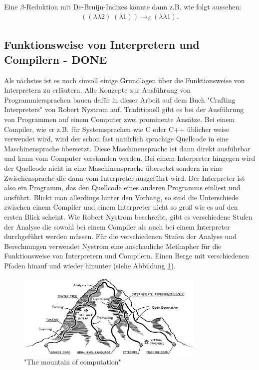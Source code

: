 \documentclass[ngerman]{article}
\begin{document}
Eine $\beta$-Reduktion mit De-Bruijn-Indizes könnte dann z.B. wie folgt aussehen:
\begin{align*}
    ((\lambda \lambda 2) \; (\lambda 1)) \rightarrow_\beta (\lambda\lambda 1).
\end{align*}

\subsection{Funktionsweise von Interpretern und Compilern - DONE}

Als nächstes ist es noch sinvoll einige Grundlagen über die Funktionsweise von Interpretern zu erläutern. Alle Konzepte zur Ausführung von Programmiersprachen bauen dafür in dieser Arbeit auf dem Buch "Crafting Interpreters" von Robert Nystrom \cite*{nystrom} auf.
Traditionell gibt es bei der Ausführung von Programmen auf einem Computer zwei prominente Ansätze. Bei einem Compiler, wie er z.B. für Systemsprachen wie C oder C++ üblicher weise verwendet wird, wird der schon fast natürlich sprachige Quellcode in eine Maschinensprache übersetzt. Diese Maschinensprache ist dann direkt ausführbar und kann vom Computer verstanden werden. Bei einem Interpreter hingegen wird der Quellcode nicht in eine Maschinensprache übersetzt sondern in eine Zwischensprache die dann vom Interpreter ausgeführt wird. Der Interpreter ist also ein Programm, das den Quellcode eines anderen Programms einliest und ausführt.
Blickt man allerdings hinter den Vorhang, so sind die Unterschiede zwischen einem Compiler und einem Interpreter nicht so groß wie es auf den ersten Blick scheint. Wie Robert Nystrom beschreibt, gibt es verschiedene Stufen der Analyse die sowohl bei einem Compiler als auch bei einem Interpreter durchgeführt werden müssen. Für die verschiedenen Stufen der Analyse und Berechnungen verwendet Nystrom eine anschauliche Methapher für die Funktionsweise von Interpretern und Compilern. Einen Berge mit verschiedenen Pfaden hinauf und wieder hinunter (siehe Abbildung \ref{fig:interpreter}).

\begin{figure}
    \centering
    \includegraphics[width=0.8\textwidth]{mountain.png}
    \caption{"The mountain of computation" \cite[Kap. 2]{nystrom}}
    \label{fig:interpreter}
\end{figure}
\end{document}
